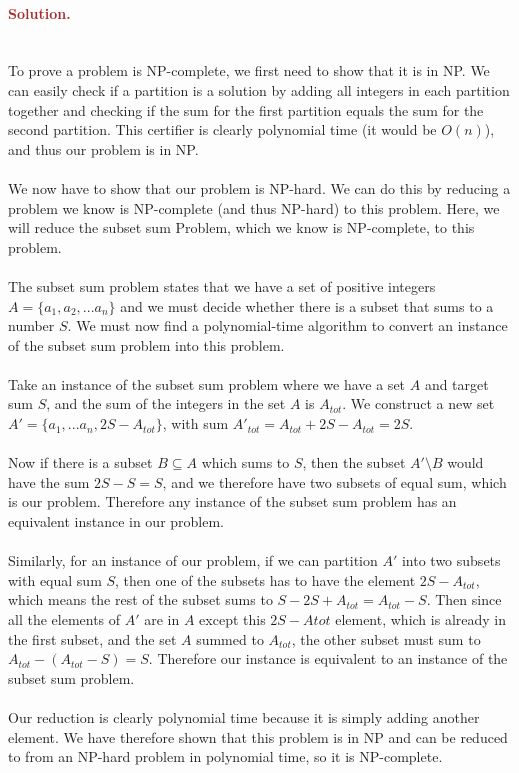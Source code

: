 \paragraph{\textcolor{brown}{Solution.}} \: \\
To prove a problem is NP-complete, we first need to show that it is in NP. We can easily check if a partition is a solution by adding all integers in each partition together and checking if the sum for the first partition equals the sum for the second partition. This certifier is clearly polynomial time (it would be $O(n)$), and thus our problem is in NP.
\\ \\ 
We now have to show that our problem is NP-hard. We can do this by reducing a problem we know is NP-complete (and thus NP-hard) to this problem. Here, we will reduce the subset sum Problem, which we know is NP-complete, to this problem.
\\ \\
The subset sum problem states that we have a set of positive integers $A=\{a_1, a_2, ... a_n\}$ and we must decide whether there is a subset that sums to a number $S$. We must now find a polynomial-time algorithm to convert an instance of the subset sum problem into this problem. 
\\ \\
Take an instance of the subset sum problem where we have a set $A$ and target sum $S$, and the sum of the integers in the set $A$ is $A_{tot}$. We construct a new set $A'=\{a_1,...a_n, 2S-A_{tot}\}$, with sum $A'_{tot}=A_{tot}+2S-A_{tot}=2S$. 
\\ \\
Now if there is a subset $B \subseteq A$ which sums to $S$, then the subset $A' \setminus B$ would have the sum $2S - S = S$, and we therefore have two subsets of equal sum, which is our problem. Therefore any instance of the subset sum problem has an equivalent instance in our problem. 
\\ \\ 
Similarly, for an instance of our problem, if we can partition $A'$ into two subsets with equal sum $S$, then one of the subsets has to have the element $2S-A_{tot}$, which means the rest of the subset sums to $S - 2S + A_{tot} = A_{tot} - S$. Then since all the elements of $A'$ are in $A$ except this $2S-A{tot}$ element, which is already in the first subset, and the set $A$ summed to $A_{tot}$, the other subset must sum to $A_{tot}-(A_{tot}-S)=S$. Therefore our instance is equivalent to an instance of the subset sum problem.
\\ \\
Our reduction is clearly polynomial time because it is simply adding another element. We have therefore shown that this problem is in NP and can be reduced to from an NP-hard problem in polynomial time, so it is NP-complete.


